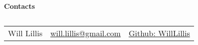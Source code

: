 \paragraph{Contacts} \label{sec:contacts}

\begin{table}[h!t]
\begin{tabular}{|C|C|C|}
\hline
{}
 &  &  \\
\hline
Will Lillis & \href{mailto:will.lillis@gmail.com}{will.lillis@gmail.com} & \href{https://github.com/WillLillis}{Github: WillLillis} \\
\hline
\end{tabular}
    \caption{ } 
\end{table}
